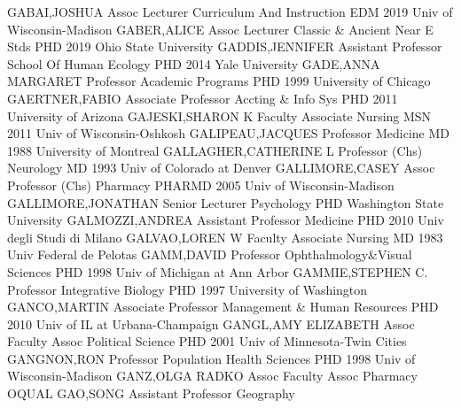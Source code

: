 \documentclass[
]{article}
\begin{document}
GABAI,JOSHUA \textbar Assoc Lecturer \textbar Curriculum And Instruction
\textbar{}  \textbar EDM 2019 Univ of Wisconsin-Madison
\textbar GABER,ALICE \textbar Assoc Lecturer \textbar Classic \& Ancient
Near E Stds \textbar{}  \textbar PHD 2019 Ohio State
University \textbar GADDIS,JENNIFER \textbar Assistant Professor
\textbar School Of Human Ecology \textbar{}  \textbar PHD
2014 Yale University \textbar GADE,ANNA MARGARET \textbar Professor
\textbar Academic Programs \textbar{}  \textbar PHD 1999
University of Chicago \textbar GAERTNER,FABIO \textbar Associate
Professor \textbar Accting \& Info Sys \textbar{} 
\textbar PHD 2011 University of Arizona \textbar GAJESKI,SHARON K
\textbar Faculty Associate \textbar Nursing \textbar{} 
\textbar MSN 2011 Univ of Wisconsin-Oshkosh \textbar GALIPEAU,JACQUES
\textbar Professor \textbar Medicine \textbar{}  \textbar MD
1988 University of Montreal \textbar GALLAGHER,CATHERINE L
\textbar Professor (Chs) \textbar Neurology \textbar{} 
\textbar MD 1993 Univ of Colorado at Denver \textbar GALLIMORE,CASEY
\textbar Assoc Professor (Chs) \textbar Pharmacy \textbar{} 
\textbar PHARMD 2005 Univ of Wisconsin-Madison
\textbar GALLIMORE,JONATHAN \textbar Senior Lecturer \textbar Psychology
\textbar{}  \textbar PHD Washington State University
\textbar GALMOZZI,ANDREA \textbar Assistant Professor \textbar Medicine
\textbar{}  \textbar PHD 2010 Univ degli Studi di Milano
\textbar GALVAO,LOREN W \textbar Faculty Associate \textbar Nursing
\textbar{}  \textbar MD 1983 Univ Federal de Pelotas
\textbar GAMM,DAVID \textbar Professor \textbar Ophthalmology\&Visual
Sciences \textbar{}  \textbar PHD 1998 Univ of Michigan at
Ann Arbor \textbar GAMMIE,STEPHEN C. \textbar Professor
\textbar Integrative Biology \textbar{}  \textbar PHD 1997
University of Washington \textbar GANCO,MARTIN \textbar Associate
Professor \textbar Management \& Human Resources \textbar{} 
\textbar PHD 2010 Univ of IL at Urbana-Champaign \textbar GANGL,AMY
ELIZABETH \textbar Assoc Faculty Assoc \textbar Political Science
\textbar{}  \textbar PHD 2001 Univ of Minnesota-Twin Cities
\textbar GANGNON,RON \textbar Professor \textbar Population Health
Sciences \textbar{}  \textbar PHD 1998 Univ of
Wisconsin-Madison \textbar GANZ,OLGA RADKO \textbar Assoc Faculty Assoc
\textbar Pharmacy \textbar{}  \textbar OQUAL
\textbar GAO,SONG \textbar Assistant Professor \textbar Geography
\end{document}
